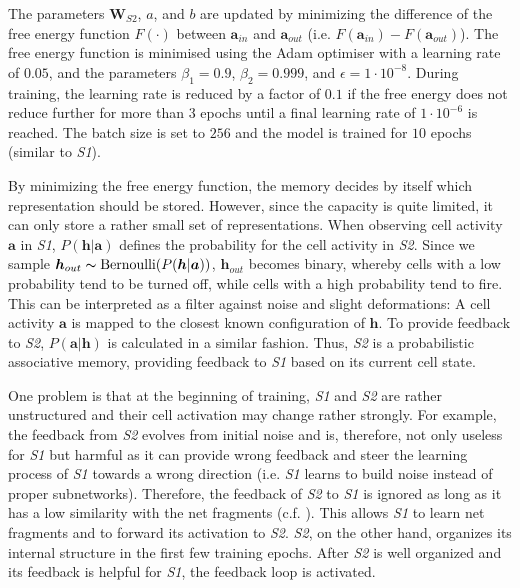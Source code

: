 The parameters $\boldsymbol{W}_{S2}$, $a$, and $b$ are updated by minimizing the difference of the free energy function $F(\cdot)$  between $\boldsymbol{a}_{in}$ and $\boldsymbol{a}_{out}$ (i.e. $F(\boldsymbol{a}_{in}) - F(\boldsymbol{a}_{out})$).
The free energy function is minimised using the Adam  optimiser with a learning rate of $0.05$, and the parameters $\beta_1=0.9$, $\beta_2=0.999$, and $\epsilon=1\cdot10^{-8}$.
During training, the learning rate is reduced by a factor of $0.1$ if the free energy does not reduce further for more than 3 epochs until a final learning rate of $1\cdot10^{-6}$ is reached.
The batch size is set to $256$ and the model is trained for $10$ epochs (similar to \emph{S1}).



By minimizing the free energy function, the memory decides by itself which representation should be stored.
However, since the capacity is quite limited, it can only store a rather small set of representations.
When observing cell activity $\boldsymbol{a}$ in \emph{S1}, $P(\boldsymbol{h}|\boldsymbol{a})$ defines the probability for the cell activity in \emph{S2}. Since we sample $\boldsymbol{h}_{out} \thicksim \text{Bernoulli}(P(\boldsymbol{h} | \boldsymbol{a}) )$, $\boldsymbol{h}_{out}$ becomes binary, whereby cells with a low probability tend to be turned off, while cells with a high probability tend to fire.
This can be interpreted as a filter against noise and slight deformations: A cell activity $\boldsymbol{a}$ is mapped to the closest known configuration of $\boldsymbol{h}$.
To provide feedback to \emph{S2}, $P(\boldsymbol{a}|\boldsymbol{h})$ is calculated in a similar fashion. Thus, \emph{S2} is a probabilistic associative memory, providing feedback to \emph{S1} based on its current cell state.

One problem is that at the beginning of training, \emph{S1} and \emph{S2} are rather unstructured and their cell activation may change rather strongly.
For example, the feedback from \emph{S2} evolves from initial noise and is, therefore, not only useless for \emph{S1} but harmful as it can provide wrong feedback and steer the learning process of \emph{S1} towards a wrong direction (i.e. \emph{S1} learns to build noise instead of proper subnetworks).
Therefore, the feedback of \emph{S2} to \emph{S1} is ignored as long as it has a low similarity with the net fragments (c.f. \secref{}).
This allows \emph{S1} to learn net fragments and to forward its activation to \emph{S2}. \emph{S2}, on the other hand, organizes its internal structure in the first few training epochs.
After \emph{S2} is well organized and its feedback is helpful for \emph{S1}, the feedback loop is activated.













